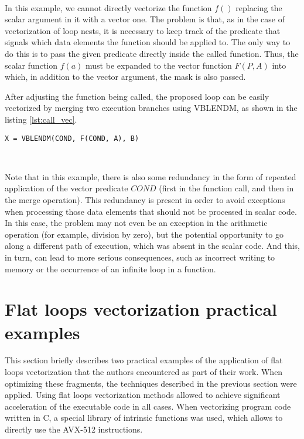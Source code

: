 \documentclass[
11pt,%
tightenlines,%
twoside,%
onecolumn,%
nofloats,%
nobibnotes,%
nofootinbib,%
superscriptaddress,%
noshowpacs,%
centertags]%
{revtex4}
\begin{document}
\

In this example, we cannot directly vectorize the function $f()$ replacing the scalar argument in it with a vector one.
The problem is that, as in the case of vectorization of loop nests, it is necessary to keep track of the predicate that signals which data elements the function should be applied to.
The only way to do this is to pass the given predicate directly inside the called function.
Thus, the scalar function $f(a)$ must be expanded to the vector function $F(P, A)$ into which, in addition to the vector argument, the mask is also passed.

After adjusting the function being called, the proposed loop can be easily vectorized by merging two execution branches using VBLENDM, as shown in the listing \ref{lst:call_vec}.

\begin{lstlisting}[caption={Vectorization of a flat loop with a function call under the condition},label={lst:call_vec}]
X = VBLENDM(COND, F(COND, A), B)
\end{lstlisting}

\

Note that in this example, there is also some redundancy in the form of repeated application of the vector predicate $COND$ (first in the function call, and then in the merge operation).
This redundancy is present in order to avoid exceptions when processing those data elements that should not be processed in scalar code.
In this case, the problem may not even be an exception in the arithmetic operation (for example, division by zero), but the potential opportunity to go along a different path of execution, which was absent in the scalar code.
And this, in turn, can lead to more serious consequences, such as incorrect writing to memory or the occurrence of an infinite loop in a function.

\section{Flat loops vectorization practical examples}

This section briefly describes two practical examples of the application of flat loops vectorization that the authors encountered as part of their work.
When optimizing these fragments, the techniques described in the previous section were applied.
Using flat loops vectorization methods allowed to achieve significant acceleration of the executable code in all cases.
When vectorizing program code written in C, a special library of intrinsic functions was used, which allows to directly use the AVX-512 instructions.
\end{document}
